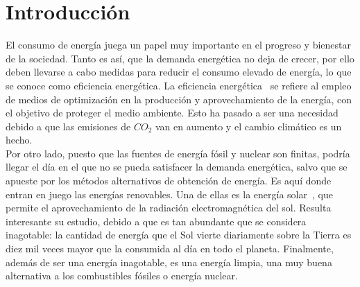 \chapter{Introducción}
\label{cap:Introduccion}
El consumo de energía juega un papel muy importante en el progreso y bienestar de la sociedad. Tanto es así, que la demanda energética no deja de crecer, por ello deben llevarse a cabo medidas para reducir el consumo elevado de energía, lo que se conoce como eficiencia energética. La eficiencia energética~\cite{GarSa12} se refiere al empleo de medios de optimización en la producción y aprovechamiento de la energía, con el objetivo de proteger el medio ambiente. Esto ha pasado a ser una necesidad debido a que las emisiones de $ CO_{2} $ van en aumento y el cambio climático es un hecho.  \\

Por otro lado, puesto que las fuentes de energía fósil y nuclear son finitas, podría llegar el día en el que no se pueda satisfacer la demanda energética, salvo que se apueste por los métodos alternativos de obtención de energía. Es aquí donde entran en juego las energías renovables. Una de ellas es la energía solar~\cite{Perp12}, que permite el aprovechamiento de la radiación electromagnética del sol. Resulta interesante su estudio, debido a que es tan abundante que se considera inagotable: la cantidad de energía que el Sol vierte diariamente sobre la Tierra es diez mil veces mayor que la consumida al día en todo el planeta. Finalmente, además de ser una energía inagotable, es una energía limpia, una muy buena alternativa a los combustibles fósiles o energía nuclear. \\

